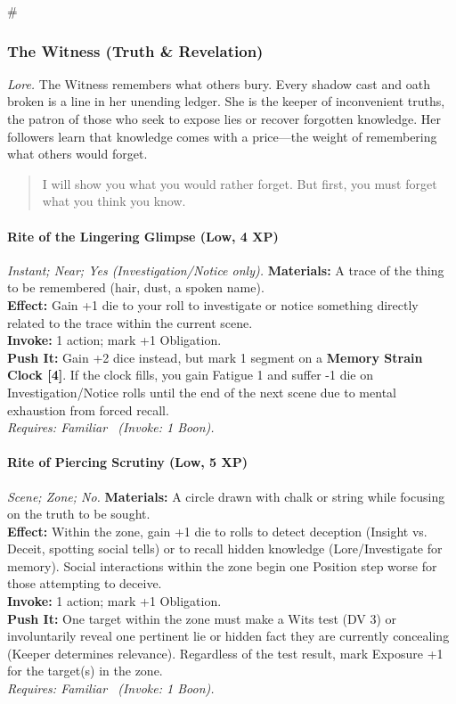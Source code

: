 # %

\subsubsection{The Witness (Truth \& Revelation)}
\textit{Lore.} The Witness remembers what others bury. Every shadow cast and oath broken is a line in her unending ledger. She is the keeper of inconvenient truths, the patron of those who seek to expose lies or recover forgotten knowledge. Her followers learn that knowledge comes with a price—the weight of remembering what others would forget.

\begin{quote}
I will show you what you would rather forget. But first, you must forget what you think you know.
\end{quote}

\paragraph*{Rite of the Lingering Glimpse (Low, 4 XP)} \emph{Instant; Near; Yes (Investigation/Notice only).}
\textbf{Materials:} A trace of the thing to be remembered (hair, dust, a spoken name).\\
\textbf{Effect:} Gain +1 die to your roll to investigate or notice something directly related to the trace within the current scene.\\
\textbf{Invoke:} 1 action; mark +1 Obligation.\\
\textbf{Push It:} Gain +2 dice instead, but mark 1 segment on a \textbf{Memory Strain Clock [4]}. If the clock fills, you gain Fatigue 1 and suffer -1 die on Investigation/Notice rolls until the end of the next scene due to mental exhaustion from forced recall.\\
\emph{Requires: Familiar \ (\textit{Invoke:} 1 Boon).}

\paragraph*{Rite of Piercing Scrutiny (Low, 5 XP)} \emph{Scene; Zone; No.}
\textbf{Materials:} A circle drawn with chalk or string while focusing on the truth to be sought.\\
\textbf{Effect:} Within the zone, gain +1 die to rolls to detect deception (Insight vs. Deceit, spotting social tells) or to recall hidden knowledge (Lore/Investigate for memory). Social interactions within the zone begin one Position step worse for those attempting to deceive.\\
\textbf{Invoke:} 1 action; mark +1 Obligation.\\
\textbf{Push It:} One target within the zone must make a Wits test (DV 3) or involuntarily reveal one pertinent lie or hidden fact they are currently concealing (Keeper determines relevance). Regardless of the test result, mark Exposure +1 for the target(s) in the zone.\\
\emph{Requires: Familiar \ (\textit{Invoke:} 1 Boon).}

